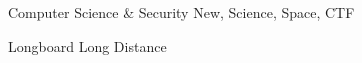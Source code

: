 

\begin{cventries}

  \begin{cvitems} %
    \item {Computer Science \& Security New, Science, Space, CTF}
    \item {Longboard Long Distance}
  \end{cvitems}

\end{cventries}
